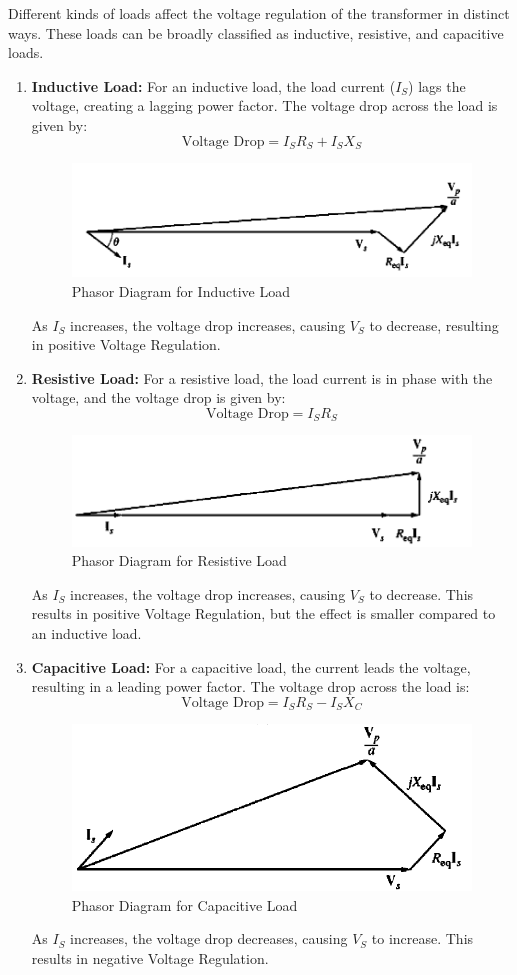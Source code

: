 \documentclass[a4paper,12pt]{article}
\begin{document}
Different kinds of loads affect the voltage regulation of the transformer in distinct ways. These loads can be broadly classified as inductive, resistive, and capacitive loads.

\begin{enumerate}
	\item \textbf{Inductive Load:}  
	For an inductive load, the load current ($I_S$) lags the voltage, creating a lagging power factor. The voltage drop across the load is given by:
	\[
	\text{Voltage Drop} = I_S R_S + I_S X_S
	\]
	
\begin{figure}[H]
	\centering
	\includegraphics[width=0.6\linewidth]{Images/1.1}
	\caption{Phasor Diagram for Inductive Load}
	\label{fig:1}
\end{figure}
	As $I_S$ increases, the voltage drop increases, causing $V_S$ to decrease, resulting in positive Voltage Regulation.
	
	\item \textbf{Resistive Load:}  
	For a resistive load, the load current is in phase with the voltage, and the voltage drop is given by:
	\[
	\text{Voltage Drop} = I_S R_S
	\]
	
	\begin{figure}[H]
		\centering
		\includegraphics[width=0.6\linewidth]{Images/1.3}
		\caption{Phasor Diagram for Resistive Load}
		\label{fig:1}
	\end{figure}
	As $I_S$ increases, the voltage drop increases, causing $V_S$ to decrease. This results in positive Voltage Regulation, but the effect is smaller compared to an inductive load.
	
	\item \textbf{Capacitive Load:}  
	For a capacitive load, the current leads the voltage, resulting in a leading power factor. The voltage drop across the load is:
	\[
	\text{Voltage Drop} = I_S R_S - I_S X_C
	\]
	
	\begin{figure}[H]
		\centering
		\includegraphics[width=0.6\linewidth]{Images/1.2}
		\caption{Phasor Diagram for Capacitive Load}
		\label{fig:1}
	\end{figure}
	As $I_S$ increases, the voltage drop decreases, causing $V_S$ to increase. This results in negative Voltage Regulation.
\end{enumerate}
\end{document}

